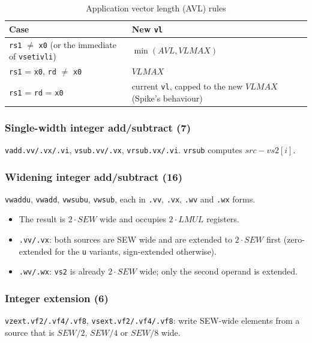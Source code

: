 \documentclass{article}
\begin{document}
\begin{table}[h]
\centering
\begin{tabular}{|p{6cm}|p{7cm}|}
    \hline
    \textbf{Case} & \textbf{New \texttt{vl}} \\
    \hline
    \texttt{rs1} $\neq$ \texttt{x0} (or the immediate of \texttt{vsetivli}) & $\min(AVL, VLMAX)$ \\
    \hline
    \texttt{rs1} = \texttt{x0}, \texttt{rd} $\neq$ \texttt{x0} & $VLMAX$ \\
    \hline
    \texttt{rs1} = \texttt{rd} = \texttt{x0} & current \texttt{vl}, capped to the new $VLMAX$
    (Spike's behaviour) \\
    \hline
\end{tabular}
\caption{Application vector length (AVL) rules}
\label{tab:avl}
\end{table}

\subsubsection*{Single-width integer add/subtract (7)}
\texttt{vadd.vv/.vx/.vi}, \texttt{vsub.vv/.vx}, \texttt{vrsub.vx/.vi}. \texttt{vrsub} computes
$src - vs2[i]$.

\subsubsection*{Widening integer add/subtract (16)}
\texttt{vwaddu}, \texttt{vwadd}, \texttt{vwsubu}, \texttt{vwsub}, each in \texttt{.vv},
\texttt{.vx}, \texttt{.wv} and \texttt{.wx} forms.
\begin{itemize}
    \item The result is $2 \cdot SEW$ wide and occupies $2 \cdot LMUL$ registers.
    \item \texttt{.vv/.vx}: both sources are SEW wide and are extended to $2 \cdot SEW$ first
    (zero-extended for the \texttt{u} variants, sign-extended otherwise).
    \item \texttt{.wv/.wx}: \texttt{vs2} is already $2 \cdot SEW$ wide; only the second operand is
    extended.
\end{itemize}

\subsubsection*{Integer extension (6)}
\texttt{vzext.vf2/.vf4/.vf8}, \texttt{vsext.vf2/.vf4/.vf8}: write SEW-wide elements from a
source that is $SEW/2$, $SEW/4$ or $SEW/8$ wide.
\end{document}
